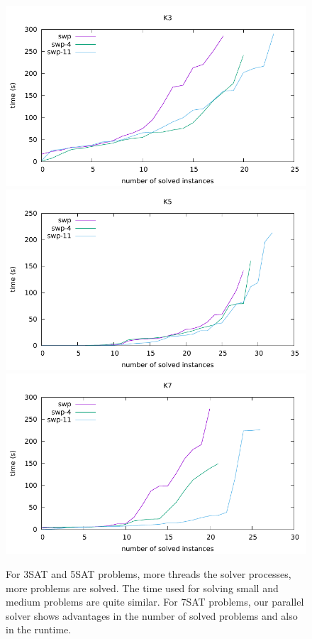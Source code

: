 \documentclass[12pt,a4paper,twoside]{scrartcl}
\numberwithin{equation}{section}
\begin{document}
 \begin{figure}[H]
\begin{center}
  \includegraphics[scale = 1]{Parallel/K3/e2.pdf}
    \includegraphics[scale = 1]{Parallel/K5/e2.pdf}
  \includegraphics[scale = 1]{Parallel/K7/e2.pdf}
  \end{center}
  \caption{For 3SAT and 5SAT problems, more threads the solver processes, more problems are solved. The time used for solving small and medium problems are quite similar. For 7SAT problems, our parallel solver shows advantages in the number of solved problems and also in the runtime.}
  \label{Experiment 6 COMBINE}
  \end{figure}
\clearpage
\end{document}
